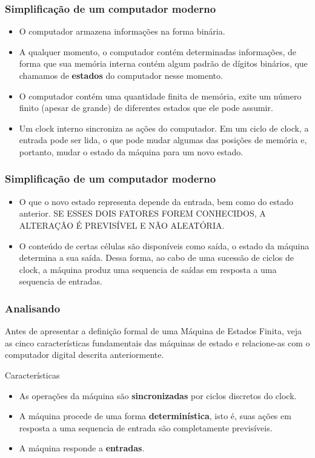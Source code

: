 \documentclass{beamer}
\begin{document}
  \begin{frame}
   \frametitle{Simplificação de um computador moderno }
   \begin{itemize}
    \item O computador armazena informações na forma binária.\pause
    \item A qualquer momento, o computador contém determinadas informações, de forma que sua memória interna contém algum padrão de 
	  dígitos binários, que chamamos de \textbf{estados} do computador nesse momento. \pause
    \item O computador contém uma quantidade finita de memória, exite um número finito (apesar de grande) de diferentes estados que 
	  ele pode assumir.\pause
    \item Um clock interno sincroniza as ações do computador. Em um ciclo de clock, a entrada pode ser lida, o que pode mudar algumas 
	  das posições de memória e, portanto, mudar o estado da máquina para um novo estado.
   \end{itemize}
  \end{frame}

  \begin{frame}
   \frametitle{Simplificação de um computador moderno }
   \begin{itemize}
    \item O que o novo estado representa depende da entrada, bem como do estado anterior. SE ESSES DOIS FATORES FOREM CONHECIDOS, A 
	  ALTERAÇÃO É PREVISÍVEL E NÃO ALEATÓRIA.\pause
    \item O conteúdo de certas células são disponíveis como saída, o estado da máquina determina a sua saída. Dessa forma, ao cabo de 
	  uma sucessão de ciclos de clock, a máquina produz uma sequencia de saídas em resposta a uma sequencia de entradas.
   \end{itemize}
  \end{frame}

  \begin{frame}
   \frametitle{Analisando}
	Antes de apresentar a definição formal de uma Máquina de Estados Finita, veja as cinco características fundamentais das máquinas de 
	estado e relacione-as com o computador digital descrita anteriormente.\pause
	
      \begin{block}{Características}
	\begin{itemize}
	  \item As operações da máquina são \textbf{sincronizadas} por ciclos discretos do clock.
	  \item A máquina procede de uma forma \textbf{determinística}, isto é, suas ações em resposta a uma sequencia de entrada são completamente 
		previsíveis.
	  \item A máquina responde a \textbf{entradas}.
	\end{itemize}
      \end{block}
  \end{frame}
\end{document}
